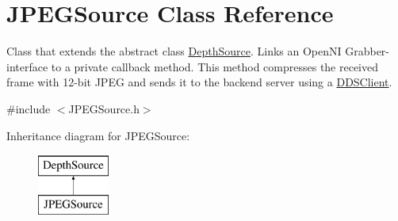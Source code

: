 \hypertarget{class_j_p_e_g_source}{\section{J\+P\+E\+G\+Source Class Reference}
\label{class_j_p_e_g_source}
}


Class that extends the abstract class \hyperlink{class_depth_source}{Depth\+Source}. Links an Open\+N\+I Grabber-\/interface to a private callback method. This method compresses the received frame with 12-\/bit J\+P\+E\+G and sends it to the backend server using a \hyperlink{class_d_d_s_client}{D\+D\+S\+Client}.  




{\ttfamily \#include $<$J\+P\+E\+G\+Source.\+h$>$}

Inheritance diagram for J\+P\+E\+G\+Source\+:\begin{figure}[H]
\begin{center}
\leavevmode
\includegraphics[height=2.000000cm]{class_j_p_e_g_source}
\end{center}
\end{figure}
